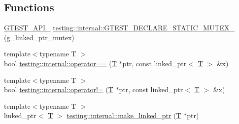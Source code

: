 \subsection*{Functions}
\begin{DoxyCompactItemize}
\item 
\hyperlink{gtest-port_8h_aa73be6f0ba4a7456180a94904ce17790}{G\+T\+E\+S\+T\+\_\+\+A\+P\+I\+\_\+} \hyperlink{namespacetesting_1_1internal_ad7c5625384cf5f6b714188f274537ef6}{testing\+::internal\+::\+G\+T\+E\+S\+T\+\_\+\+D\+E\+C\+L\+A\+R\+E\+\_\+\+S\+T\+A\+T\+I\+C\+\_\+\+M\+U\+T\+E\+X\+\_\+} (g\+\_\+linked\+\_\+ptr\+\_\+mutex)
\item 
{\footnotesize template$<$typename T $>$ }\\bool \hyperlink{namespacetesting_1_1internal_ad1cb54a206a209ddace17a05359d38ae}{testing\+::internal\+::operator==} (\hyperlink{functions__7_8js_adf1f3edb9115acb0a1e04209b7a9937b}{T} $\ast$ptr, const linked\+\_\+ptr$<$ \hyperlink{functions__7_8js_adf1f3edb9115acb0a1e04209b7a9937b}{T} $>$ \&x)
\item 
{\footnotesize template$<$typename T $>$ }\\bool \hyperlink{namespacetesting_1_1internal_a6910869259f8f31825b471e9190fa09a}{testing\+::internal\+::operator!=} (\hyperlink{functions__7_8js_adf1f3edb9115acb0a1e04209b7a9937b}{T} $\ast$ptr, const linked\+\_\+ptr$<$ \hyperlink{functions__7_8js_adf1f3edb9115acb0a1e04209b7a9937b}{T} $>$ \&x)
\item 
{\footnotesize template$<$typename T $>$ }\\linked\+\_\+ptr$<$ \hyperlink{functions__7_8js_adf1f3edb9115acb0a1e04209b7a9937b}{T} $>$ \hyperlink{namespacetesting_1_1internal_a0d79fad1f772844eff35dfe955f24fd6}{testing\+::internal\+::make\+\_\+linked\+\_\+ptr} (\hyperlink{functions__7_8js_adf1f3edb9115acb0a1e04209b7a9937b}{T} $\ast$ptr)
\end{DoxyCompactItemize}
